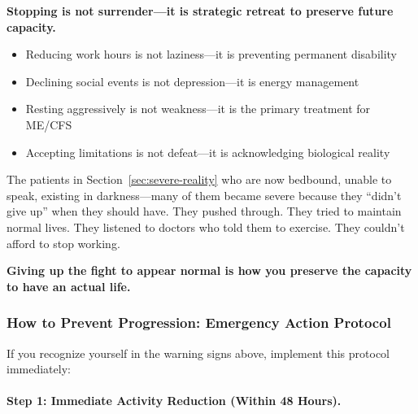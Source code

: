 \begin{keypoint}
\textbf{Stopping is not surrender---it is strategic retreat to preserve future capacity.}

\begin{itemize}
    \item Reducing work hours is not laziness---it is preventing permanent disability
    \item Declining social events is not depression---it is energy management
    \item Resting aggressively is not weakness---it is the primary treatment for ME/CFS
    \item Accepting limitations is not defeat---it is acknowledging biological reality
\end{itemize}

The patients in Section~\ref{sec:severe-reality} who are now bedbound, unable to speak, existing in darkness---many of them became severe because they ``didn't give up'' when they should have. They pushed through. They tried to maintain normal lives. They listened to doctors who told them to exercise. They couldn't afford to stop working.

\textbf{Giving up the fight to appear normal is how you preserve the capacity to have an actual life.}
\end{keypoint}

\subsubsection{How to Prevent Progression: Emergency Action Protocol}
\label{sec:prevent-progression-protocol}

If you recognize yourself in the warning signs above, implement this protocol immediately:

\paragraph{Step 1: Immediate Activity Reduction (Within 48 Hours).}

